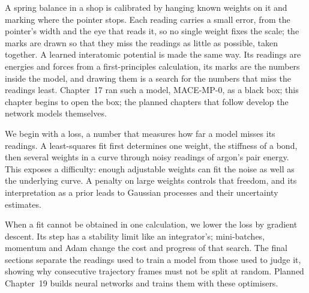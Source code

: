 A spring balance in a shop is calibrated by hanging known weights on it
and marking where the pointer stops. Each reading carries a small error,
from the pointer's width and the eye that reads it, so no single weight
fixes the scale; the marks are drawn so that they miss the readings as
little as possible, taken together. A learned interatomic potential is
made the same way. Its readings are energies and forces from a
first-principles calculation, its marks are the numbers inside the model,
and drawing them is a search for the numbers that miss the readings
least. Chapter~17 ran such a model, MACE-MP-0, as a black box; this
chapter begins to open the box; the planned chapters that follow develop
the network models themselves.

We begin with a loss, a number that measures how far a model misses its
readings. A least-squares fit first determines one weight, the stiffness
of a bond, then several weights in a curve through noisy readings of
argon's pair energy. This exposes a difficulty: enough adjustable
weights can fit the noise as well as the underlying curve. A penalty on
large weights controls that freedom, and its interpretation as a prior
leads to Gaussian processes and their uncertainty estimates.

When a fit cannot be obtained in one calculation, we lower the loss by
gradient descent. Its step has a stability limit like an integrator's;
mini-batches, momentum and Adam change the cost and progress of that
search. The final sections separate the readings used to train a model
from those used to judge it, showing why consecutive trajectory frames
must not be split at random. Planned Chapter~19 builds neural networks
and trains them with these optimisers.
